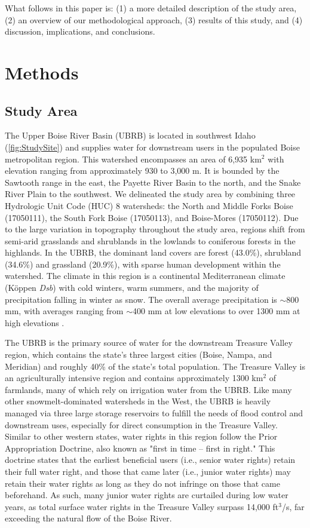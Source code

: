 \documentclass[water,article,submit,moreauthors,pdftex,10pt,a4paper]{mdpi}
\theoremstyle{mdpi}
\newcounter{ex}
\newcounter{re}
\theoremstyle{mdpidefinition}
\begin{document}
What follows in this paper is: (1) a more detailed description of the study area, (2) an overview of our methodological approach, (3) results of this study, and (4) discussion, implications, and conclusions. 

\section{Methods}
\subsection{Study Area}
The Upper Boise River Basin (UBRB) is located in southwest Idaho (\cref{fig:StudySite}) and supplies water for downstream users in the populated Boise metropolitan region. This watershed encompasses an area of 6,935 km${}^2$ with elevation ranging from approximately 930 to 3,000 m. It is bounded by the Sawtooth range in the east, the Payette River Basin to the north, and the Snake River Plain to the southwest. We delineated the study area by combining three Hydrologic Unit Code (HUC) 8 watersheds: the North and Middle Forks Boise (17050111), the South Fork Boise (17050113), and Boise-Mores (17050112). Due to the large variation in topography throughout the study area, regions shift from semi-arid grasslands and shrublands in the lowlands to coniferous forests in the highlands. In the UBRB, the dominant land covers are forest (43.0\%), shrubland (34.6\%) and grassland (20.9\%), with sparse human development within the watershed. The climate in this region is a continental Mediterranean climate (K\"{o}ppen \textit{Dsb}) with cold winters, warm summers, and the majority of precipitation falling in winter as snow. The overall average precipitation is $\sim$800 mm, with averages ranging from $\sim$400 mm at low elevations to over 1300 mm at high elevations \citep{Daly:2008hsa}.

The UBRB is the primary source of water for the downstream Treasure Valley region, which contains the state's three largest cities (Boise, Nampa, and Meridian) and roughly 40\% of the state's total population. The Treasure Valley is an agriculturally intensive region and contains approximately 1300 km${}^2$ of farmlands, many of which rely on irrigation water from the UBRB.  Like many other snowmelt-dominated watersheds in the West, the UBRB is heavily managed via three large storage reservoirs to fulfill the needs of flood control and downstream uses, especially for direct consumption in the Treasure Valley. Similar to other western states, water rights in this region follow the Prior Appropriation Doctrine, also known as "first in time – first in right." This doctrine states that the earliest beneficial users (i.e., senior water rights) retain their full water right, and those that came later (i.e., junior water rights) may retain their water rights as long as they do not infringe on those that came beforehand. As such, many junior water rights are curtailed during low water years, as total surface water rights in the Treasure Valley surpass 14,000 ft${}^3$/s, far exceeding the natural flow of the Boise River.
\end{document}

